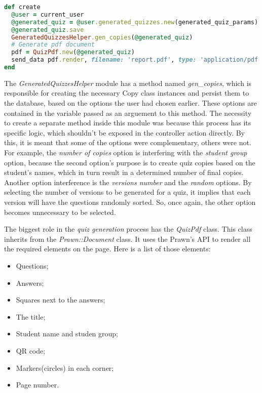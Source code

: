 \begin{lstlisting}[language=Ruby, caption={Create method of the GeneratedQuizzesController class}, label=create_method]
def create
  @user = current_user
  @generated_quiz = @user.generated_quizzes.new(generated_quiz_params)
  @generated_quiz.save
  GeneratedQuizzesHelper.gen_copies(@generated_quiz)
  # Generate pdf document
  pdf = QuizPdf.new(@generated_quiz)
  send_data pdf.render, filename: 'report.pdf', type: 'application/pdf', disposition: 'inline'
end
\end{lstlisting}

\vspace{5pt}


The \textit{GeneratedQuizzesHelper} module has a method named \textit{gen\_copies}, which is responsible for creating the necessary Copy class instances and persist them to the database, based on the options the user had chosen earlier. These options are contained in the variable passed as an arguement to this method. The necessity to create a separate method inside this module was because this process has its specific logic, which shouldn't be exposed in the controller action directly. By this, it is meant that some of the options were complementary, others were not. For example, the \textit{number of copies} option is interfering with the \textit{student group} option, because the second option's purpose is to create quiz copies based on the student's names, which in turn result in a determined number of final copies. Another option interference is the \textit{versions number} and the \textit{random} options. By selecting the number of versions to be generated for a quiz, it implies that each version will have the questions randomly sorted. So, once again, the other option becomes unnecessary to be selected.

The biggest role in the \textit{quiz generation} process has the \textit{QuizPdf} class. This class inherits from the \textit{Prawn::Document} class. It uses the Prawn's API to render all the required elements on the page. Here is a list of those elements: 
\vspace{-6pt}
\begin{itemize}
  \item Questions;
  \item Answers;
  \item Squares next to the answers;
  \item The title;
  \item Student name and studen group; 
  \item QR code;
  \item Markers(circles) in each corner;
  \item Page number.
\end{itemize}

